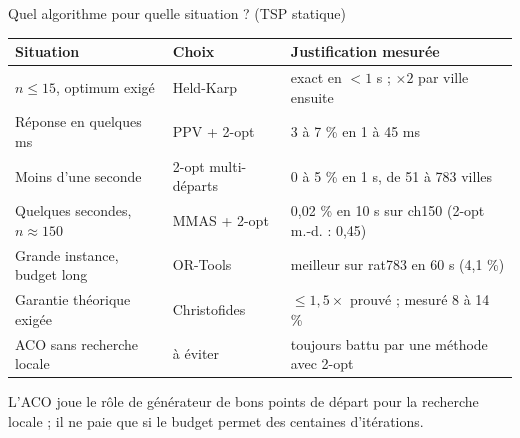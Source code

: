 \documentclass[aspectratio=169,11pt]{beamer}
\begin{document}
\begin{frame}{Quel algorithme pour quelle situation ? (TSP statique)}
  \centering
  \footnotesize
  \begin{tabular}{p{3.9cm}p{2.6cm}p{5.6cm}}
    \toprule
    Situation & Choix & Justification mesurée \\
    \midrule
    $n \le 15$, optimum exigé & Held-Karp & exact en $< 1$ s ; $\times 2$ par ville ensuite \\
    Réponse en quelques ms & PPV + 2-opt & 3 à 7 \% en 1 à 45 ms \\
    Moins d'une seconde & 2-opt multi-départs & 0 à 5 \% en 1 s, de 51 à 783 villes \\
    Quelques secondes, $n \approx 150$ & \textcolor{acoorange}{MMAS + 2-opt} & 0,02 \% en 10 s sur ch150 (2-opt m.-d. : 0,45) \\
    Grande instance, budget long & OR-Tools & meilleur sur rat783 en 60 s (4,1 \%) \\
    Garantie théorique exigée & Christofides & $\le 1{,}5\times$ prouvé ; mesuré 8 à 14 \% \\
    ACO sans recherche locale & à éviter & toujours battu par une méthode avec 2-opt \\
    \bottomrule
  \end{tabular}

  \vspace{0.6em}
  \raggedright\small
  L'ACO joue le rôle de \alert{générateur de bons points de départ} pour la recherche locale ;
  il ne paie que si le budget permet \alert{des centaines d'itérations}.
\end{frame}
\end{document}
